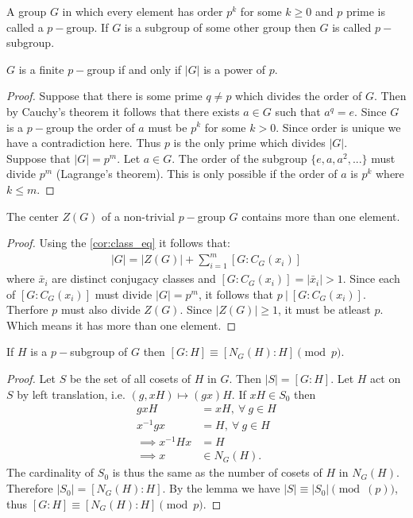 \begin{definition}
  A group $G$ in which every element has order $p^k$ for some $k\geq 0$ and $p$ prime is called a $p-$group. If $G$ is a subgroup of some other group then $G$ is called $p-$subgroup.
\end{definition}
\begin{corollary}
  $G$ is a finite $p-$group if and only if $|G|$ is a power of $p$.
\end{corollary}
\begin{proof}
  Suppose that there is some prime $q \neq p$ which divides the order of $G$. Then by Cauchy's theorem it follows that there exists $a\in G$ such that $a^q =e$. Since $G$ is a $p-$group the order of $a$ must be $p^k$ for some $k>0$. Since order is unique we have a contradiction here. Thus $p$ is the only prime which divides $|G|$.\\

  Suppose that $|G| = p^m$. Let $a\in G$. The order of the subgroup $\{e,a,a^2,...\}$ must divide $p^m$ (Lagrange's theorem). This is only possible if the order of $a$ is $p^k$ where $k\leq m$.
\end{proof}
\begin{proposition}
  The center $Z(G)$ of a non-trivial $p-$group $G$ contains more than one element.
\end{proposition}
\begin{proof}
  Using the \cref{cor:class_eq} it follows that:
  \begin{align*}
    |G| = |Z(G)| + \sum_{i=1}^m [G: C_G(x_i)]
  \end{align*}
  where $\bar{x}_i$ are distinct conjugacy classes and $[G:C_G(x_i)]= |\bar{x}_i| > 1$. Since each of $[G:C_G(x_i)]$ must divide $|G| = p^m$, it follows that $p\ |\ [G:C_G(x_i)]$. Therfore $p$ must also divide $Z(G)$. Since $|Z(G)| \geq 1$, it must be atleast $p$. Which means it has more than one element.
\end{proof}
\begin{lemma}
  If $H$ is a $p-$subgroup of $G$ then $[G:H] \equiv [N_G(H):H]\pmod{p}$.
\end{lemma}
\begin{proof}
  Let $S$ be the set of all cosets of $H$ in $G$. Then $|S| = [G:H]$. Let $H$ act on $S$ by left translation, i.e. $(g,xH)\mapsto (gx)H$. If $xH \in S_0$ then
  \begin{align*}
    gxH &= xH,\ \forall\ g\in H\\
    x^{-1}gx &= H,\ \forall\ g\in H\\
    \implies x^{-1}Hx &= H\\
    \implies x&\in N_G(H).
  \end{align*}
  The cardinality of $S_0$ is thus the same as the number of cosets of $H$ in $N_G(H)$. Therefore $|S_0| = [N_G(H): H]$. By the lemma we have $|S|\equiv |S_0| \pmod(p)$, thus $[G:H] \equiv [N_G(H):H] \pmod{p}$. 
\end{proof}
